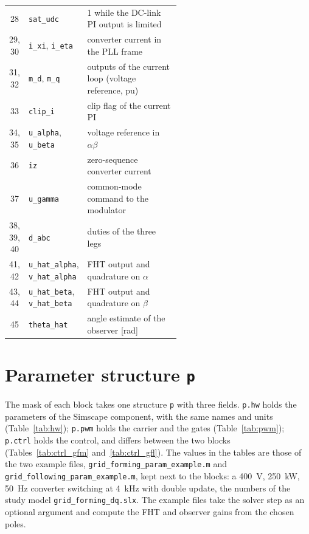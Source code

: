 \documentclass[11pt,a4paper]{scrartcl}
\newcommand{\code}[1]{\texttt{#1}}
\begin{document}
\begin{onehalfspace}
\begin{longtable}{@{} c l p{0.56\linewidth} @{}}
	28 & \code{sat\_udc} & 1 while the DC-link PI output is limited \\
	29, 30 & \code{i\_xi}, \code{i\_eta} & converter current in the PLL frame \\
	31, 32 & \code{m\_d}, \code{m\_q} & outputs of the current loop (voltage reference, pu) \\
	33 & \code{clip\_i} & clip flag of the current PI \\
	34, 35 & \code{u\_alpha}, \code{u\_beta} & voltage reference in $\alpha\beta$ \\
	36 & \code{iz} & zero-sequence converter current \\
	37 & \code{u\_gamma} & common-mode command to the modulator \\
	38, 39, 40 & \code{d\_abc} & duties of the three legs \\
	41, 42 & \code{u\_hat\_alpha}, \code{v\_hat\_alpha} & FHT output and quadrature on $\alpha$ \\
	43, 44 & \code{u\_hat\_beta}, \code{v\_hat\_beta} & FHT output and quadrature on $\beta$ \\
	45 & \code{theta\_hat} & angle estimate of the observer [\si{\radian}] \\
\end{longtable}
\normalsize
{}

\section{Parameter structure \code{p}}
\label{sec:param}

The mask of each block takes one structure \code{p} with three fields. \code{p.hw} holds the parameters of the Simscape component, with the same names and units (Table~\ref{tab:hw}); \code{p.pwm} holds the carrier and the gates (Table~\ref{tab:pwm}); \code{p.ctrl} holds the control, and differs between the two blocks (Tables~\ref{tab:ctrl_gfm} and~\ref{tab:ctrl_gfl}). The values in the tables are those of the two example files, \code{grid\_forming\_param\_example.m} and \code{grid\_following\_param\_example.m}, kept next to the blocks: a \SI{400}{\volt}, \SI{250}{\kilo\watt}, \SI{50}{\hertz} converter switching at \SI{4}{\kilo\hertz} with double update, the numbers of the study model \code{grid\_forming\_dq.slx}. The example files take the solver step as an optional argument and compute the FHT and observer gains from the chosen poles.


\end{onehalfspace}
\end{document}
